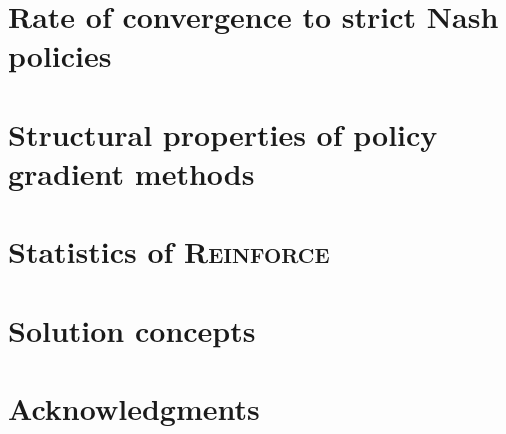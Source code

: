 \documentclass[reqno]{amsart}
\theoremstyle{plain}
\theoremstyle{definition}
\theoremstyle{remark}
\numberwithin{example}{section}		%
\newcommand{\debug}[1]{#1}		%
\newcommand{\reinforce}{\textsc{\debug{Reinforce}}\xspace}
\begin{document}
\section{Rate of convergence to strict Nash policies}
\label{app:deterministic}



\section{Structural properties of policy gradient methods}
\label{app:marl}



\section{Statistics of \reinforce}
\label{app:reinforce}



\section{Solution concepts}
\label{app:solutions}



\section*{Acknowledgments}
\begingroup
\small

\endgroup




\end{document}
